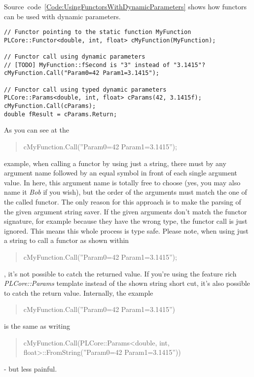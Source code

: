 Source~code~\ref{Code:UsingFunctorsWithDynamicParameters} shows how functors can be used with dynamic parameters.
\begin{lstlisting}[float=htb,label=Code:UsingFunctorsWithDynamicParameters,caption={Using functors with dynamic parameters}]
// Functor pointing to the static function MyFunction
PLCore::Functor<double, int, float> cMyFunction(MyFunction);

// Functor call using dynamic parameters
// [TODO] MyFunction::fSecond is "3" instead of "3.1415"?
cMyFunction.Call("Param0=42 Param1=3.1415");

// Functor call using typed dynamic parameters
PLCore::Params<double, int, float> cParams(42, 3.1415f);
cMyFunction.Call(cParams);
double fResult = cParams.Return;
\end{lstlisting}
As you can see at the \begin{quote}cMyFunction.Call(''Param0=42 Param1=3.1415'');\end{quote} example, when calling a functor by using just a string, there must by any argument name followed by an equal symbol in front of each single argument value. In here, this argument name is totally free to choose (yes, you may also name it \emph{Bob} if you wish), but the order of the arguments must match the one of the called functor. The only reason for this approach is to make the parsing of the given argument string saver. If the given arguments don't match the functor signature, for example because they have the wrong type, the functor call is just ignored. This means this whole process is type safe. Please note, when using just a string to call a functor as shown within \begin{quote}cMyFunction.Call(''Param0=42 Param1=3.1415'');\end{quote}, it's not possible to catch the returned value. If you're using the feature rich \emph{PLCore::Params} template instead of the shown string short cut, it's also possible to catch the return value. Internally, the example \begin{quote}cMyFunction.Call(''Param0=42 Param1=3.1415'')\end{quote} is the same as writing \begin{quote}cMyFunction.Call(PLCore::Params<double, int, float>::FromString(''Param0=42 Param1=3.1415''))\end{quote} - but less painful.

